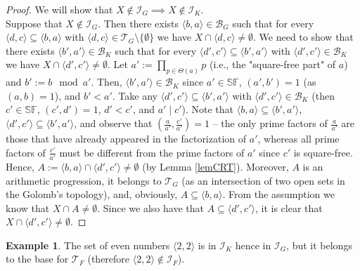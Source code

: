 \documentclass{amsart}
\theoremstyle{definition}
\newtheorem{ex}[thm]{Example}
\newcommand{\I}{\mathcal I}
\newcommand{\T}{\mathcal{T}}
\newcommand{\B}{\mathcal{B}}
\newcommand{\SqrFr}{\mathbb{SF}}
\newcommand{\arithseq}[2]{\langle#2, #1\rangle}
\begin{document}
\begin{proof}
We will show that $X \not\in \I_G \implies X \not\in \I_K$.\\
Suppose that $X \not\in \I_G$. Then there exists $\arithseq{a}{b}\in \B_G$ such that for every $\arithseq{c}{d}\subseteq \arithseq{a}{b}$ with $\arithseq{c}{d}\in \T_G\setminus\{\emptyset\}$ we have $X\cap \arithseq{c}{d} \neq \emptyset$.
We need to show that there exists $\arithseq{a'}{b'}\in \B_K$ such that for every $\arithseq{c'}{d'}\subseteq \arithseq{a'}{b'}$ with $\arithseq{c'}{d'}\in \B_K$ we have $X\cap \arithseq{c'}{d'} \neq \emptyset$.
Let $a' := \prod_{p\in\Theta(a)}{p}$ (i.e., the "square-free part" of $a$) and $b' := b \mod a'$. Then, $\arithseq{a'}{b'} \in \B_K$ since $a' \in \SqrFr$, $(a',b') = 1$ (as $(a,b) = 1$), and $b'<a'$.
Take any $\arithseq{c'}{d'} \subseteq \arithseq{a'}{b'}$ with $\arithseq{c'}{d'}\in \B_K$ (then $c' \in \SqrFr$, $(c',d')=1$, $d'<c'$, and $a'\mid c'$).
Note that $\arithseq{a}{b}\subseteq \arithseq{a'}{b'}$, $\arithseq{c'}{d'}\subseteq \arithseq{a'}{b'}$, and observe that $\left(\frac{a}{a'}, \frac{c'}{a'}\right) = 1$ -- the only prime factors of $\frac{a}{a'}$ are those that have already appeared in the factorization of $a'$, whereas all prime factors of $\frac{c'}{a'}$ must be different from the prime factors of $a'$ since $c'$ is square-free. 
Hence, $A:= \arithseq{a}{b}\cap\arithseq{c'}{d'} \neq \emptyset$ (by Lemma \ref{lemCRT}). Moreover, $A$ is an arithmetic progression, it belongs to $\T_G$ (as an intersection of two open sets in the Golomb's topology), and, obviously, $A \subseteq \arithseq{a}{b}$. From the assumption we know that $X\cap A \neq \emptyset$. Since we also have that $A \subseteq \arithseq{c'}{d'}$, it is clear that $X\cap \arithseq{c'}{d'} \neq \emptyset$.
\end{proof}

\begin{ex} \label{even}
The set of even numbers $\arithseq{2}{2}$ is in $\I_K$ hence in $\I_G$, but it belongs to the base for $\T_F$ (therefore $\arithseq{2}{2}\notin \I_F$).
\end{ex}
\end{document}
